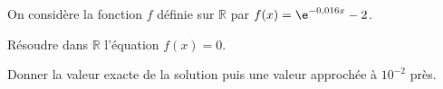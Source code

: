 \medskip

On considère la fonction $f$ définie sur $\mathbb{R}$ par $f(x) = \e^{-0,016x} - 2$.

Résoudre dans $\mathbb{R}$ l'équation $f(x) = 0$.

Donner la valeur exacte de la solution puis une valeur approchée à $10^{-2}$ près.

\bigskip
